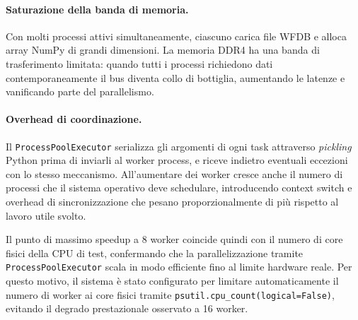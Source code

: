 \paragraph{Saturazione della banda di memoria.}
Con molti processi attivi simultaneamente, ciascuno carica file WFDB e alloca array NumPy di grandi dimensioni. La memoria DDR4 ha una banda di trasferimento limitata: quando tutti i processi richiedono dati contemporaneamente il bus diventa collo di bottiglia, aumentando le latenze e vanificando parte del parallelismo.

\paragraph{Overhead di coordinazione.}
Il \texttt{ProcessPoolExecutor} serializza gli argomenti di ogni task attraverso \textit{pickling} Python prima di inviarli al worker process, e riceve indietro eventuali eccezioni con lo stesso meccanismo. All'aumentare dei worker cresce anche il numero di processi che il sistema operativo deve schedulare, introducendo context switch e overhead di sincronizzazione che pesano proporzionalmente di più rispetto al lavoro utile svolto.

Il punto di massimo speedup a 8 worker coincide quindi con il numero di core fisici della CPU di test, confermando che la parallelizzazione tramite \texttt{ProcessPoolExecutor} scala in modo efficiente fino al limite hardware reale. Per questo motivo, il sistema è stato configurato per limitare automaticamente il numero di worker ai core fisici tramite \texttt{psutil.cpu\_count(logical=False)}, evitando il degrado prestazionale osservato a 16 worker.

